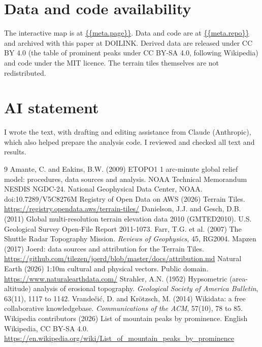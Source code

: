 \documentclass[11pt,a4paper]{article}
\begin{document}
\section*{Data and code availability}
The interactive map is at \url{{{meta.page}}}. Data and code are at \url{{{meta.repo}}} and archived with this paper at {{DOILINK}}. Derived data are released under CC BY 4.0 (the table of prominent peaks under CC BY-SA 4.0, following Wikipedia) and code under the MIT licence. The terrain tiles themselves are not redistributed.

\section*{AI statement}
I wrote the text, with drafting and editing assistance from Claude (Anthropic), which also helped prepare the analysis code. I reviewed and checked all text and results.

\begin{thebibliography}{9}
 Amante, C. and Eakins, B.W. (2009) ETOPO1 1 arc-minute global relief model: procedures, data sources and analysis. NOAA Technical Memorandum NESDIS NGDC-24. National Geophysical Data Center, NOAA. doi:10.7289/V5C8276M
 Registry of Open Data on AWS (2026) Terrain Tiles. \url{https://registry.opendata.aws/terrain-tiles/}
 Danielson, J.J. and Gesch, D.B. (2011) Global multi-resolution terrain elevation data 2010 (GMTED2010). U.S. Geological Survey Open-File Report 2011-1073.
 Farr, T.G. et al. (2007) The Shuttle Radar Topography Mission. \emph{Reviews of Geophysics}, 45, RG2004.
 Mapzen (2017) Joerd: data sources and attribution for the Terrain Tiles. \url{https://github.com/tilezen/joerd/blob/master/docs/attribution.md}
 Natural Earth (2026) 1:10m cultural and physical vectors. Public domain. \url{https://www.naturalearthdata.com/}
 Strahler, A.N. (1952) Hypsometric (area-altitude) analysis of erosional topography. \emph{Geological Society of America Bulletin}, 63(11), 1117 to 1142.
 Vrandečić, D. and Krötzsch, M. (2014) Wikidata: a free collaborative knowledgebase. \emph{Communications of the ACM}, 57(10), 78 to 85.
 Wikipedia contributors (2026) List of mountain peaks by prominence. English Wikipedia, CC BY-SA 4.0. \url{https://en.wikipedia.org/wiki/List_of_mountain_peaks_by_prominence}
\end{thebibliography}
\end{document}
